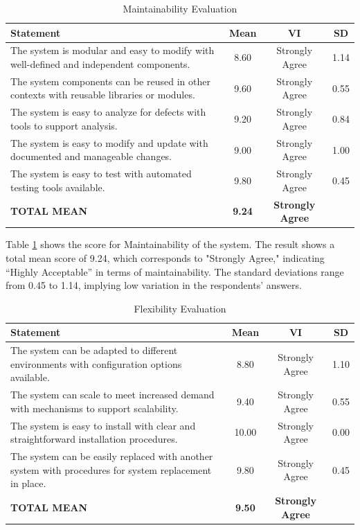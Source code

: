 \documentclass[12pt,a4paper,]{article}
\begin{document}
	\begin{table}[h!]
		\centering
		\caption{Maintainability Evaluation}
		\label{mntnblty}
		\renewcommand{\arraystretch}{1.2}
		\begin{tabularx}{\linewidth}{|X|c|c|c|}
			\hline
			\textbf{Statement} & \textbf{Mean} & \textbf{VI} & \textbf{SD} \\ \hline
			The system is modular and easy to modify with well-defined and independent components.
			& 8.60 & Strongly Agree & 1.14 \\ \hline
			The system components can be reused in other contexts with reusable libraries or modules.
			& 9.60 & Strongly Agree & 0.55 \\ \hline
			The system is easy to analyze for defects with tools to support analysis.
			& 9.20 & Strongly Agree & 0.84 \\ \hline
			The system is easy to modify and update with documented and manageable changes.
			& 9.00 & Strongly Agree & 1.00 \\ \hline
			The system is easy to test with automated testing tools available.
			& 9.80 & Strongly Agree & 0.45 \\ \hline
			\textbf{TOTAL MEAN} & \textbf{9.24} & \textbf{Strongly Agree} & \\ \hline
		\end{tabularx}
	\end{table}
	
	Table \ref{mntnblty} shows the score for Maintainability of the system. The result shows a total mean score of 9.24, which corresponds to "Strongly Agree," indicating “Highly Acceptable” in terms of maintainability. The standard deviations range from 0.45 to 1.14, implying low variation in the respondents’ answers.
	
	\begin{table}[h!]
		\centering
		\caption{Flexibility Evaluation}
		\label{flxblty}
		\renewcommand{\arraystretch}{1.2}
		\begin{tabularx}{\linewidth}{|X|c|c|c|}
			\hline
			\textbf{Statement} & \textbf{Mean} & \textbf{VI} & \textbf{SD} \\ \hline
			The system can be adapted to different environments with configuration options available.
			& 8.80 & Strongly Agree & 1.10 \\ \hline
			The system can scale to meet increased demand with mechanisms to support scalability.
			& 9.40 & Strongly Agree & 0.55 \\ \hline
			The system is easy to install with clear and straightforward installation procedures.
			& 10.00 & Strongly Agree & 0.00 \\ \hline
			The system can be easily replaced with another system with procedures for system replacement in place.
			& 9.80 & Strongly Agree & 0.45 \\ \hline
			\textbf{TOTAL MEAN} & \textbf{9.50} & \textbf{Strongly Agree} & \\ \hline
		\end{tabularx}
	\end{table}
	
\end{document}

